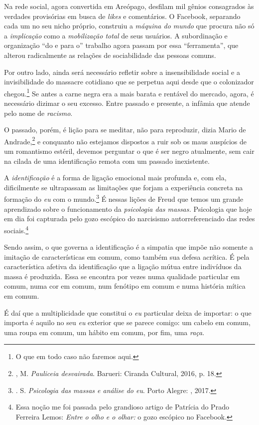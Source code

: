 Na rede social, agora convertida em Areópago, desfilam mil gênios
consagrados às verdades provisórias em busca de \emph{likes} e
comentários. O Facebook, separando cada um no seu nicho próprio,
construiu a \emph{máquina do mundo} que procura não só a
\emph{implicação} como a \emph{mobilização total} de seus usuários. A
subordinação e organização ``do e para o'' trabalho agora passam por
essa ``ferramenta'', que alterou radicalmente as relações de
sociabilidade das pessoas comuns.

Por outro lado, ainda será necessário refletir sobre a insensibilidade
social e a invisibilidade do massacre cotidiano que se perpetua aqui
desde que o colonizador chegou.\footnote{O que em todo caso não faremos
  aqui.} Se antes a carne negra era a mais barata e rentável do
mercado, agora, é necessário dizimar o seu excesso. Entre passado e
presente, a infâmia que atende pelo nome de \emph{racismo}.

O passado, porém, é lição para se meditar, não para reproduzir, dizia
Mario de Andrade,\footnote{, M. \emph{Pauliceia desvairada}.
  Barueri: Ciranda Cultural, 2016, p. 18.} e conquanto não estejamos
dispostos a ruir sob os maus auspícios de um romantismo estéril, devemos
perguntar o que é ser negro atualmente, sem cair na cilada de uma
identificação remota com um passado inexistente.

A \emph{identificação} é a forma de ligação emocional mais profunda e,
com ela, dificilmente se ultrapassam as limitações que forjam a
experiência concreta na formação do \emph{eu} com o mundo.\footnote{.
  S. \emph{Psicologia das massas e análise do eu}. Porto Alegre: ,
  2017.} É nessas lições de Freud que temos um grande aprendizado sobre
o funcionamento da \emph{psicologia das massas.}
Psicologia que hoje em dia foi
capturada pelo gozo escópico do narcisismo autorreferenciado das redes
sociais.\footnote{Essa noção me foi passada pelo grandioso artigo de
  Patrícia do Prado Ferreira Lemos: \emph{Entre o olho e o olhar:} o
  gozo escópico no Facebook.}

Sendo assim, o que governa a identificação é a simpatia que impõe não
somente a imitação de características em comum, como também sua defesa
acrítica. É pela característica afetiva da identificação que a ligação
mútua entre indivíduos da massa é produzida. Essa se encontra por vezes
numa qualidade particular em comum, numa cor em comum, num fenótipo em
comum e numa história mítica em comum.

É daí que a multiplicidade que constitui o \emph{eu} particular deixa de
importar: o que importa é aquilo no seu \emph{eu} exterior que se parece
comigo: um cabelo em comum, uma roupa em comum, um hábito em comum, por
fim, uma \emph{raça}.

